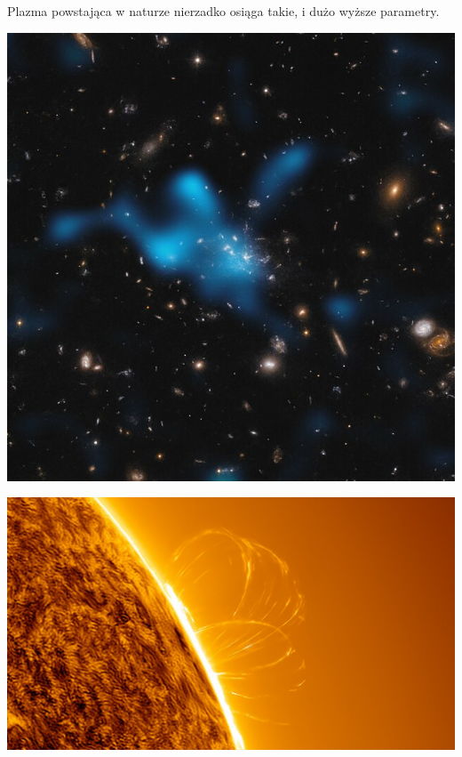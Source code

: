 \documentclass[10pt]{beamer}
\begin{document}
        \begin{frame}{Plazma powstająca w naturze nierzadko osiąga takie, i dużo wyższe parametry.}
            \begin{minipage}{0.49\textwidth}
                \centering
                \includegraphics[width=0.8\linewidth]{intracluster.jpg}
            \end{minipage}
            \hfill
            \begin{minipage}{0.49\textwidth}
                \centering
                \includegraphics[width=0.8\linewidth]{star.jpg}
            \end{minipage}
        \end{frame}
\end{document}
